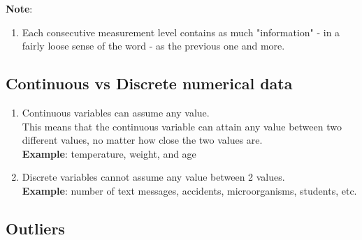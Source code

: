 \textbf{Note}:
\begin{enumerate}
    \item Each consecutive measurement level contains as much "information" - in a fairly loose sense of the word - as the previous one and more. \hfill \cite{statistics/book/Statistics-for-Data-Scientists/Maurits-Kaptein}
\end{enumerate}


\subsection{Continuous vs Discrete numerical data \cite{statistics/book/Statistics-for-Data-Scientists/Maurits-Kaptein}}\label{Data/Measurement-Levels/Continuous vs Discrete numerical data}

\label{Data/Measurement-Levels/Continuous vs Discrete numerical data/Continuous numerical data}
\label{Data/Measurement-Levels/Continuous vs Discrete numerical data/Discrete numerical data}

\begin{enumerate}
    \item Continuous variables can assume any value. \hfill \cite{statistics/book/Statistics-for-Data-Scientists/Maurits-Kaptein} \\
    This means that the continuous variable can attain any value between two different values, no matter how close the two values are. \hfill \cite{statistics/book/Statistics-for-Data-Scientists/Maurits-Kaptein}\\
    \textbf{Example}: temperature, weight, and age \hfill \cite{statistics/book/Statistics-for-Data-Scientists/Maurits-Kaptein}

    \item Discrete variables cannot assume any value between 2 values. \hfill \cite{statistics/book/Statistics-for-Data-Scientists/Maurits-Kaptein}\\
    \textbf{Example}: number of text messages, accidents, microorganisms, students, etc. \hfill \cite{statistics/book/Statistics-for-Data-Scientists/Maurits-Kaptein}
\end{enumerate}


\subsection{Outliers \cite{statistics/book/Statistics-for-Data-Scientists/Maurits-Kaptein}}\label{Data/Measurement-Levels/Outliers}

